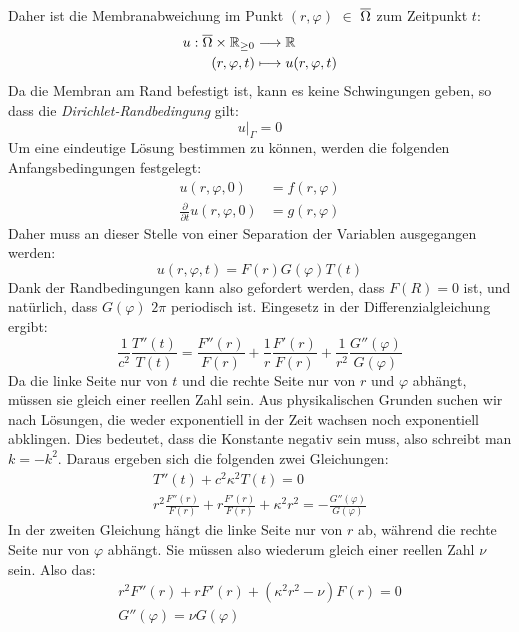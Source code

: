 Daher ist die Membranabweichung im Punkt $(r,\varphi)$ $\in$ $\overline{\rm \Omega}$ zum Zeitpunkt $t$:
\begin{align*}
	u: \overline{\rm \Omega} \times \mathbb{R}_{\geq 0} &\longrightarrow \mathbb{R}\\
	(r,\varphi,t) &\longmapsto u(r,\varphi,t)
\end{align*}
Da die Membran am Rand befestigt ist, kann es keine Schwingungen geben, so dass die \textit{Dirichlet-Randbedingung} gilt:
\begin{equation*}
	u\big|_{\Gamma} = 0
\end{equation*}
Um eine eindeutige Lösung bestimmen zu können, werden die folgenden Anfangsbedingungen festgelegt:
\begin{align*}
	u(r,\varphi, 0) &= f(r,\varphi)\\
	\frac{\partial}{\partial t} u(r,\varphi, 0) &= g(r,\varphi)
\end{align*}
Daher muss an dieser Stelle von einer Separation der Variablen ausgegangen werden:
\begin{equation*}
	u(r,\varphi, t) = F(r)G(\varphi)T(t)
\end{equation*}
Dank der Randbedingungen kann also gefordert werden, dass $F(R)=0$ ist, und natürlich, dass $G(\varphi)$ $2\pi$ periodisch ist. Eingesetz in der Differenzialgleichung ergibt:
\begin{equation*}
	\frac{1}{c^2}\frac{T''(t)}{T(t)}=\frac{F''(r)}{F(r)}+\frac{1}{r}\frac{F'(r)}{F(r)}+\frac{1}{r^2}\frac{G''(\varphi)}{G(\varphi)}
\end{equation*}
Da die linke Seite nur von $t$ und die rechte Seite nur von $r$ und $\varphi$ abhängt, müssen sie gleich einer reellen Zahl sein. Aus physikalischen Grunden suchen wir nach Lösungen, die weder exponentiell in der Zeit wachsen noch exponentiell abklingen. Dies bedeutet, dass die Konstante negativ sein muss, also schreibt man $k=-k^2$. Daraus ergeben sich die folgenden zwei Gleichungen:
\begin{gather*}
	T''(t) + c^2\kappa^2T(t) = 0\\
	r^2\frac{F''(r)}{F(r)} + r \frac{F'(r)}{F(r)} +\kappa^2 r^2 = - \frac{G''(\varphi)}{G(\varphi)}
\end{gather*}
In der zweiten Gleichung hängt die linke Seite nur von $r$ ab, während die rechte Seite nur von $\varphi$ abhängt. Sie müssen also wiederum gleich einer reellen Zahl $\nu$ sein. Also das:
\begin{gather*}
	r^2F''(r) + rF'(r) + (\kappa^2 r^2 - \nu)F(r) = 0 \\
	G''(\varphi) = \nu G(\varphi)
\end{gather*}
